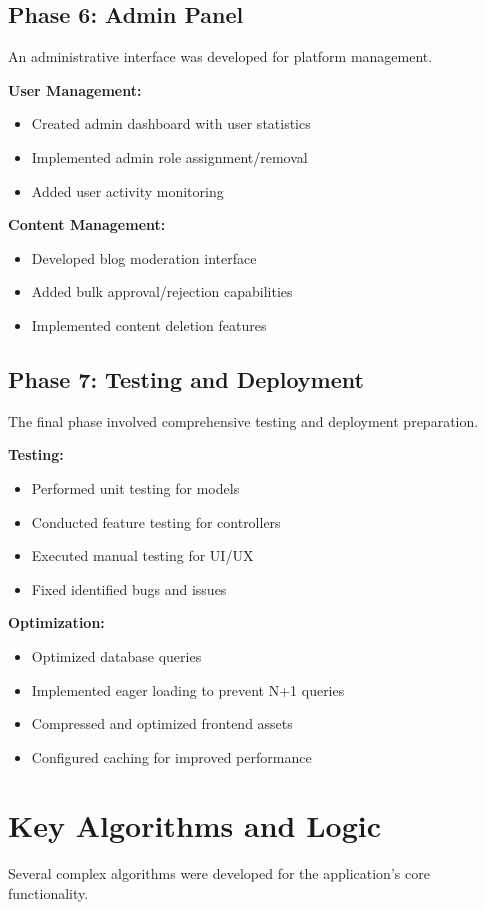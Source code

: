 \documentclass[12pt,a4paper]{report}
\newcommand{\JustifiedNormal}{\fontsize{12}{14}\selectfont\justifying\setlength{\parindent}{0pt}}
\begin{document}
\subsection{Phase 6: Admin Panel}
\JustifiedNormal
An administrative interface was developed for platform management.

\textbf{User Management:}
\begin{itemize}
  \item Created admin dashboard with user statistics
  \item Implemented admin role assignment/removal
  \item Added user activity monitoring
\end{itemize}

\textbf{Content Management:}
\begin{itemize}
  \item Developed blog moderation interface
  \item Added bulk approval/rejection capabilities
  \item Implemented content deletion features
\end{itemize}

\subsection{Phase 7: Testing and Deployment}
\JustifiedNormal
The final phase involved comprehensive testing and deployment preparation.

\textbf{Testing:}
\begin{itemize}
  \item Performed unit testing for models
  \item Conducted feature testing for controllers
  \item Executed manual testing for UI/UX
  \item Fixed identified bugs and issues
\end{itemize}

\textbf{Optimization:}
\begin{itemize}
  \item Optimized database queries
  \item Implemented eager loading to prevent N+1 queries
  \item Compressed and optimized frontend assets
  \item Configured caching for improved performance
\end{itemize}

\section{Key Algorithms and Logic}
\JustifiedNormal
Several complex algorithms were developed for the application's core functionality.
\end{document}
